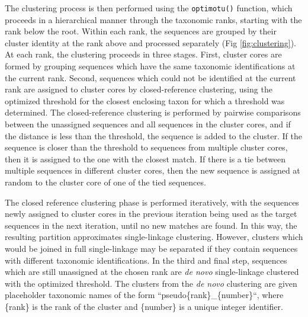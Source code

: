\documentclass[
]{article}
\begin{document}
The clustering process is then performed using the \texttt{optimotu()} function, which proceeds in a hierarchical manner through the taxonomic ranks, starting with the rank below the root.
Within each rank, the sequences are grouped by their cluster identity at the rank above and processed separately (Fig \ref{fig:clustering}).
At each rank, the clustering proceeds in three stages.
First, cluster cores are formed by grouping sequences which have the same taxonomic identifications at the current rank.
Second, sequences which could not be identified at the current rank are assigned to cluster cores by closed-reference clustering, using the optimized threshold for the closest enclosing taxon for which a threshold was determined.
The closed-reference clustering is performed by pairwise comparisons between the unassigned sequences and all sequences in the cluster cores, and if the distance is less than the threshold, the sequence is added to the cluster.
If the sequence is closer than the threshold to sequences from multiple cluster cores, then it is assigned to the one with the closest match.
If there is a tie between multiple sequences in different cluster cores, then the new sequence is assigned at random to the cluster core of one of the tied sequences.

The closed reference clustering phase is performed iteratively, with the sequences newly assigned to cluster cores in the previous iteration being used as the target sequences in the next iteration, until no new matches are found.
In this way, the resulting partition approximates single-linkage clustering.
However, clusters which would be joined in full single-linkage may be separated if they contain sequences with different taxonomic identifications.
In the third and final step, sequences which are still unassigned at the chosen rank are \emph{de novo} single-linkage clustered with the optimized threshold.
The clusters from the \emph{de novo} clustering are given placeholder taxonomic names of the form ``pseudo\{rank\}\_\{number\}``, where \{rank\} is the rank of the cluster and \{number\} is a unique integer identifier.
\end{document}
